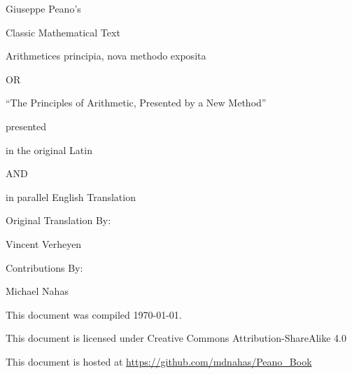 \documentclass{book}
\begin{document}
 




%
{ \centering

  \Large Giuseppe Peano's

  \normalsize Classic Mathematical Text

  \Huge Arithmetices principia, nova methodo exposita

  \Large OR

  \Huge ``The Principles of Arithmetic, Presented by a New Method''

  \normalsize presented

  \Large in the original Latin

  \normalsize AND

  \Large in parallel English Translation

  \vspace{1cm}

  \normalsize Original Translation By:

  \Large Vincent Verheyen

  \vspace{1cm}

  \normalsize Contributions By:

  \normalsize Michael Nahas

  \vfill

  
  \normalsize This document was compiled \today.

  \normalsize This document is licensed under Creative Commons Attribution-ShareAlike 4.0

  \normalsize This document is hosted at \url{https://github.com/mdnahas/Peano_Book}

} %
\newpage  
\end{document}
